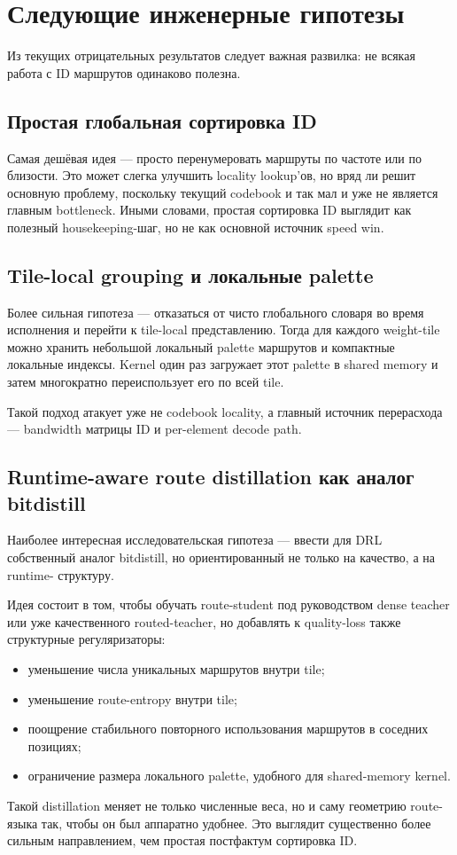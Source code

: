 \section{Следующие инженерные гипотезы}

Из текущих отрицательных результатов следует важная развилка: не всякая работа с
ID маршрутов одинаково полезна.

\subsection{Простая глобальная сортировка ID}

Самая дешёвая идея --- просто перенумеровать маршруты по частоте или по близости.
Это может слегка улучшить locality lookup'ов, но вряд ли решит основную проблему,
поскольку текущий codebook и так мал и уже не является главным bottleneck.
Иными словами, простая сортировка ID выглядит как полезный housekeeping-шаг, но
не как основной источник speed win.

\subsection{Tile-local grouping и локальные palette}

Более сильная гипотеза --- отказаться от чисто глобального словаря во время
исполнения и перейти к tile-local представлению. Тогда для каждого weight-tile
можно хранить небольшой локальный palette маршрутов и компактные локальные
индексы. Kernel один раз загружает этот palette в shared memory и затем
многократно переиспользует его по всей tile.

Такой подход атакует уже не codebook locality, а главный источник перерасхода ---
bandwidth матрицы ID и per-element decode path.

\subsection{Runtime-aware route distillation как аналог bitdistill}

Наиболее интересная исследовательская гипотеза --- ввести для DRL собственный
аналог bitdistill, но ориентированный не только на качество, а на runtime-
структуру.

Идея состоит в том, чтобы обучать route-student под руководством dense teacher
или уже качественного routed-teacher, но добавлять к quality-loss также
структурные регуляризаторы:

\begin{itemize}[leftmargin=1.5em]
\item уменьшение числа уникальных маршрутов внутри tile;
\item уменьшение route-entropy внутри tile;
\item поощрение стабильного повторного использования маршрутов в соседних
позициях;
\item ограничение размера локального palette, удобного для shared-memory kernel.
\end{itemize}

Такой distillation меняет не только численные веса, но и саму геометрию route-
языка так, чтобы он был аппаратно удобнее. Это выглядит существенно более
сильным направлением, чем простая постфактум сортировка ID.